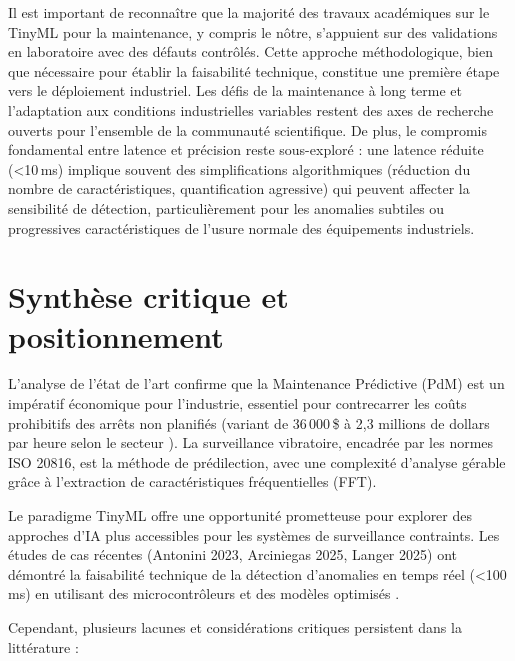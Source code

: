 Il est important de reconnaître que la majorité des travaux académiques sur le TinyML pour la maintenance, y compris le nôtre, s'appuient sur des validations en laboratoire avec des défauts contrôlés. Cette approche méthodologique, bien que nécessaire pour établir la faisabilité technique, constitue une première étape vers le déploiement industriel. Les défis de la maintenance à long terme et l'adaptation aux conditions industrielles variables restent des axes de recherche ouverts pour l'ensemble de la communauté scientifique. De plus, le compromis fondamental entre latence et précision reste sous-exploré : une latence réduite (<10\,ms) implique souvent des simplifications algorithmiques (réduction du nombre de caractéristiques, quantification agressive) qui peuvent affecter la sensibilité de détection, particulièrement pour les anomalies subtiles ou progressives caractéristiques de l'usure normale des équipements industriels.

\section{Synthèse critique et positionnement}
\label{sec:synthese_critique}

L'analyse de l'état de l'art confirme que la Maintenance Prédictive (PdM) est un impératif économique pour l'industrie, essentiel pour contrecarrer les coûts prohibitifs des arrêts non planifiés (variant de 36\,000\,\$ à 2,3 millions de dollars par heure selon le secteur \cite{siemens2024}). La surveillance vibratoire, encadrée par les normes ISO 20816, est la méthode de prédilection, avec une complexité d'analyse gérable grâce à l'extraction de caractéristiques fréquentielles (FFT).

Le paradigme TinyML offre une opportunité prometteuse pour explorer des approches d'IA plus accessibles pour les systèmes de surveillance contraints. Les études de cas récentes (Antonini 2023, Arciniegas 2025, Langer 2025) ont démontré la faisabilité technique de la détection d'anomalies en temps réel (<100\,ms) en utilisant des microcontrôleurs et des modèles optimisés \cite{antonini2023,arciniegas2025,langer2025}.

Cependant, plusieurs lacunes et considérations critiques persistent dans la littérature :

